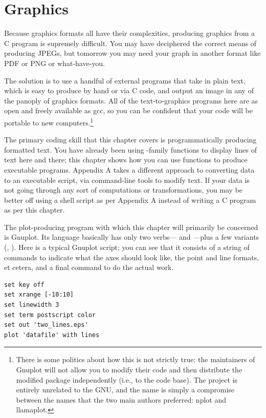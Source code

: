 \chapter{Graphics} \label{gnuplot} 

Because graphics formats all have their complexities,
producing graphics from a C program is supremely difficult. You may have
deciphered the correct means of producing JPEGs, but tomorrow you may
need your graph in another format like PDF or PNG or what-have-you.

The solution is to use a handful of external
programs that take in plain text, which is easy to produce by hand or
via C code, and output an image in any of the panoply of graphics
formats.  All of the text-to-graphics programs here are as open and freely
available as gcc, so you can be confident that your code will be portable
to new computers.\footnote{There is some politics about how this is not
strictly true: the maintainers of Gnuplot will not allow you to modify
their code and then distribute the modified package independently (i.e.,
to  the code base). The project is entirely unrelated to the
GNU, and the name is simply a compromise between the names that the two
main authors preferred: nplot and llamaplot.}

The primary coding skill that this chapter covers is programmatically
producing formatted text. You have already been using -family
functions to display lines of text here and there; this chapter shows
how you can use  functions to produce executable programs.
Appendix A takes a different approach to converting data to an executable
script, via command-line tools to modify text. If your data is not going
through any sort of computations or transformations, you may be better
off using a shell script as per Appendix A instead of writing a C
program as per this chapter.

The plot-producing program with which this chapter will primarily be
concerned is Gnuplot. Its language
basically has only two verbs--- and ---plus a few
variants (, ). Here is a typical Gnuplot script;
you can see that it
consists of a string of  commands to indicate what the axes
should look like, the point and line formats, et cetera, and a final
 command to do the actual work.
\begin{lstlisting}
set key off
set xrange [-10:10]
set linewidth 3
set term postscript color
set out 'two_lines.eps'
plot 'datafile' with lines
\end{lstlisting}

